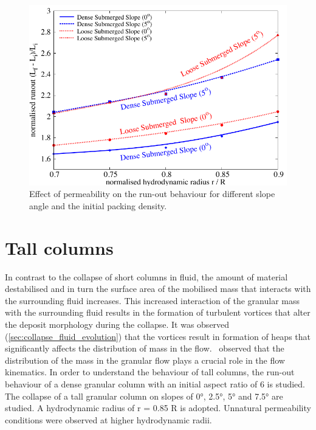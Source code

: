 \begin{figure}
\centering
\includegraphics[width=0.97\columnwidth]{Perm_Runout_slope}
\caption{Effect of permeability on the run-out behaviour for different slope 
angle and the initial packing density.}
\label{fig:Perm_Runout_slope}
\end{figure}

\clearpage

\section{Tall columns}

In contrast to the collapse of short columns in fluid, the amount of material 
destabilised and in turn the surface area of the mobilised mass that interacts 
with the surrounding fluid increases. This increased interaction of the 
granular 
mass with the surrounding fluid results in the formation of turbulent vortices 
that alter the deposit morphology during the collapse. It was observed 
(\cref{sec:collapse_fluid_evolution}) that the 
vortices result in formation of heaps that significantly affects the 
distribution of mass in the flow.~\citet{Staron2007a} observed that the 
distribution of the mass in the granular flow plays a crucial role in the flow 
kinematics. In order to understand the behaviour of tall columns, the run-out 
behaviour of a dense granular column with an initial aspect ratio of 6 is 
studied. The collapse of a tall granular column on slopes of 0\si{\degree}, 
2.5\si{\degree}, 5\si{\degree} and 7.5\si{\degree} are studied. A hydrodynamic 
radius of r = 0.85 R is adopted. Unnatural permeability conditions were 
observed at higher hydrodynamic radii.

